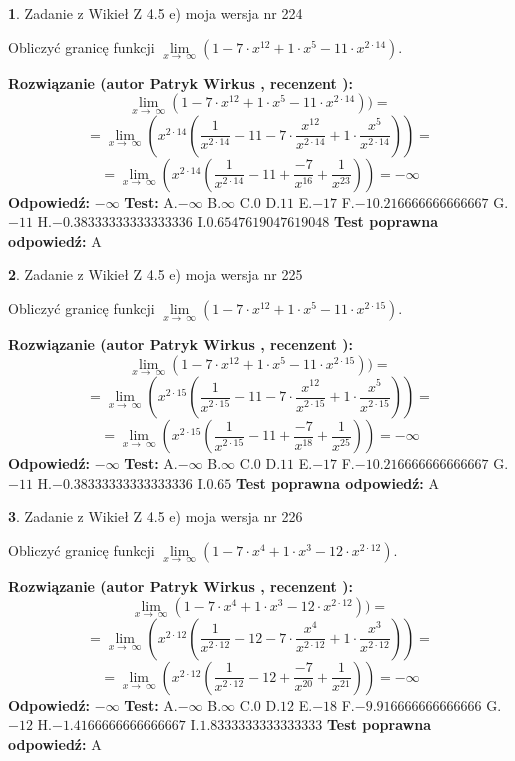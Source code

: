 \documentclass[12pt, a4paper]{article}
\theoremstyle{definition} %
\newtheorem{zad}{}
\newcommand{\zadStart}[1]{\begin{zad}#1\newline}
\newcommand{\zadStop}{\end{zad}}
\newcommand{\rozwStart}[2]{\noindent \textbf{Rozwiązanie (autor #1 , recenzent #2): }\newline}
\newcommand{\rozwStop}{\newline}
\newcommand{\odpStart}{\noindent \textbf{Odpowiedź:}\newline}
\newcommand{\odpStop}{\newline}
\newcommand{\testStart}{\noindent \textbf{Test:}\newline}
\newcommand{\testStop}{\newline}
\newcommand{\kluczStart}{\noindent \textbf{Test poprawna odpowiedź:}\newline}
\newcommand{\kluczStop}{\newline}
\begin{document}
\zadStart{Zadanie z Wikieł Z 4.5 e) moja wersja nr 224}


Obliczyć granicę funkcji  $\lim\limits_{x\to\ \infty}(1 - 7 \cdot x^{12}+1 \cdot x^{5}- 11 \cdot x^{2\cdot14})$.
\zadStop
\rozwStart{Patryk Wirkus}{}
$$\lim\limits_{x\to\ \infty}(1 - 7 \cdot x^{12}+1 \cdot x^{5}- 11 \cdot x^{2\cdot14}))=$$
$$=\lim\limits_{x\to\ \infty}(x^{2\cdot14}(\frac{1}{x^{2\cdot14}}-11 -7 \cdot \frac{x^{12}}{x^{2\cdot14}}+1 \cdot \frac{x^{5}}{x^{2\cdot14}}))=$$
$$=\lim\limits_{x\to\ \infty}(x^{2\cdot14}(\frac{1}{x^{2\cdot14}}-11 + \frac{-7}{x^{16}}+ \frac{1}{x^{23}}))=-\infty$$
\rozwStop
\odpStart
$-\infty$
\odpStop
\testStart
A.$-\infty$ B.$\infty$ C.$0$ D.$11$ E.$-17$
F.$-10.216666666666667$ G.$-11$
H.$-0.38333333333333336$
I.$0.6547619047619048$
\testStop
\kluczStart
A
\kluczStop



\zadStart{Zadanie z Wikieł Z 4.5 e) moja wersja nr 225}


Obliczyć granicę funkcji  $\lim\limits_{x\to\ \infty}(1 - 7 \cdot x^{12}+1 \cdot x^{5}- 11 \cdot x^{2\cdot15})$.
\zadStop
\rozwStart{Patryk Wirkus}{}
$$\lim\limits_{x\to\ \infty}(1 - 7 \cdot x^{12}+1 \cdot x^{5}- 11 \cdot x^{2\cdot15}))=$$
$$=\lim\limits_{x\to\ \infty}(x^{2\cdot15}(\frac{1}{x^{2\cdot15}}-11 -7 \cdot \frac{x^{12}}{x^{2\cdot15}}+1 \cdot \frac{x^{5}}{x^{2\cdot15}}))=$$
$$=\lim\limits_{x\to\ \infty}(x^{2\cdot15}(\frac{1}{x^{2\cdot15}}-11 + \frac{-7}{x^{18}}+ \frac{1}{x^{25}}))=-\infty$$
\rozwStop
\odpStart
$-\infty$
\odpStop
\testStart
A.$-\infty$ B.$\infty$ C.$0$ D.$11$ E.$-17$
F.$-10.216666666666667$ G.$-11$
H.$-0.38333333333333336$
I.$0.65$
\testStop
\kluczStart
A
\kluczStop



\zadStart{Zadanie z Wikieł Z 4.5 e) moja wersja nr 226}


Obliczyć granicę funkcji  $\lim\limits_{x\to\ \infty}(1 - 7 \cdot x^{4}+1 \cdot x^{3}- 12 \cdot x^{2\cdot12})$.
\zadStop
\rozwStart{Patryk Wirkus}{}
$$\lim\limits_{x\to\ \infty}(1 - 7 \cdot x^{4}+1 \cdot x^{3}- 12 \cdot x^{2\cdot12}))=$$
$$=\lim\limits_{x\to\ \infty}(x^{2\cdot12}(\frac{1}{x^{2\cdot12}}-12 -7 \cdot \frac{x^{4}}{x^{2\cdot12}}+1 \cdot \frac{x^{3}}{x^{2\cdot12}}))=$$
$$=\lim\limits_{x\to\ \infty}(x^{2\cdot12}(\frac{1}{x^{2\cdot12}}-12 + \frac{-7}{x^{20}}+ \frac{1}{x^{21}}))=-\infty$$
\rozwStop
\odpStart
$-\infty$
\odpStop
\testStart
A.$-\infty$ B.$\infty$ C.$0$ D.$12$ E.$-18$
F.$-9.916666666666666$ G.$-12$
H.$-1.4166666666666667$
I.$1.8333333333333333$
\testStop
\kluczStart
A
\kluczStop
\end{document}
